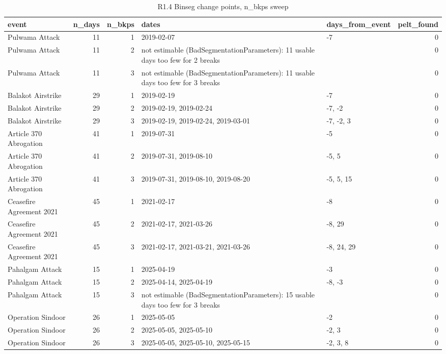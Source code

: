 \begin{table}
\caption{R1.4 Binseg change points, n_bkps sweep}
\label{tab:r1r2_changepoints}
\begin{tabular}{lrrllr}
\toprule
event & n\_days & n\_bkps & dates & days\_from\_event & pelt\_found \\
\midrule
Pulwama Attack & 11 & 1 & 2019-02-07 & -7 & 0 \\
Pulwama Attack & 11 & 2 & not estimable (BadSegmentationParameters): 11 usable days too few for 2 breaks &  & 0 \\
Pulwama Attack & 11 & 3 & not estimable (BadSegmentationParameters): 11 usable days too few for 3 breaks &  & 0 \\
Balakot Airstrike & 29 & 1 & 2019-02-19 & -7 & 0 \\
Balakot Airstrike & 29 & 2 & 2019-02-19, 2019-02-24 & -7, -2 & 0 \\
Balakot Airstrike & 29 & 3 & 2019-02-19, 2019-02-24, 2019-03-01 & -7, -2, 3 & 0 \\
Article 370 Abrogation & 41 & 1 & 2019-07-31 & -5 & 0 \\
Article 370 Abrogation & 41 & 2 & 2019-07-31, 2019-08-10 & -5, 5 & 0 \\
Article 370 Abrogation & 41 & 3 & 2019-07-31, 2019-08-10, 2019-08-20 & -5, 5, 15 & 0 \\
Ceasefire Agreement 2021 & 45 & 1 & 2021-02-17 & -8 & 0 \\
Ceasefire Agreement 2021 & 45 & 2 & 2021-02-17, 2021-03-26 & -8, 29 & 0 \\
Ceasefire Agreement 2021 & 45 & 3 & 2021-02-17, 2021-03-21, 2021-03-26 & -8, 24, 29 & 0 \\
Pahalgam Attack & 15 & 1 & 2025-04-19 & -3 & 0 \\
Pahalgam Attack & 15 & 2 & 2025-04-14, 2025-04-19 & -8, -3 & 0 \\
Pahalgam Attack & 15 & 3 & not estimable (BadSegmentationParameters): 15 usable days too few for 3 breaks &  & 0 \\
Operation Sindoor & 26 & 1 & 2025-05-05 & -2 & 0 \\
Operation Sindoor & 26 & 2 & 2025-05-05, 2025-05-10 & -2, 3 & 0 \\
Operation Sindoor & 26 & 3 & 2025-05-05, 2025-05-10, 2025-05-15 & -2, 3, 8 & 0 \\
\bottomrule
\end{tabular}
\end{table}
